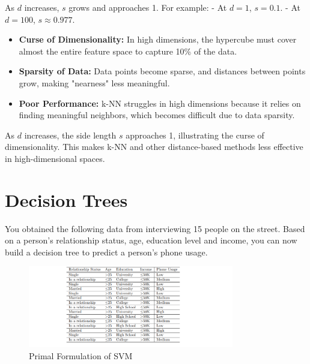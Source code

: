 \documentclass[a3paper,12pt]{extarticle} %
\begin{document}
\begin{enumerate}
As \(d\) increases, \(s\) grows and approaches 1. For example:
- At \(d = 1\), \(s = 0.1\).
- At \(d = 100\), \(s \approx 0.977\).


\begin{itemize}
    \item \textbf{Curse of Dimensionality:} In high dimensions, the hypercube must cover almost the entire feature space to capture 10\% of the data.
    \item \textbf{Sparsity of Data:} Data points become sparse, and distances between points grow, making "nearness" less meaningful.
    \item \textbf{Poor Performance:} k-NN struggles in high dimensions because it relies on finding meaningful neighbors, which becomes difficult due to data sparsity.
\end{itemize}


As \(d\) increases, the side length \(s\) approaches 1, illustrating the curse of dimensionality. This makes k-NN and other distance-based methods less effective in high-dimensional spaces.

\end{enumerate}
\newpage

\section{Decision Trees}
You obtained the following data from interviewing 15 people on the street. Based on a person’s relationship
status, age, education level and income, you can now build a decision tree to predict a person’s phone usage.
\begin{figure}[h]
    \centering
    \includegraphics[width=0.8\textwidth]{section2.png}
    \caption{Primal Formulation of SVM}
    \label{fig:primal}
\end{figure}
\end{document}
